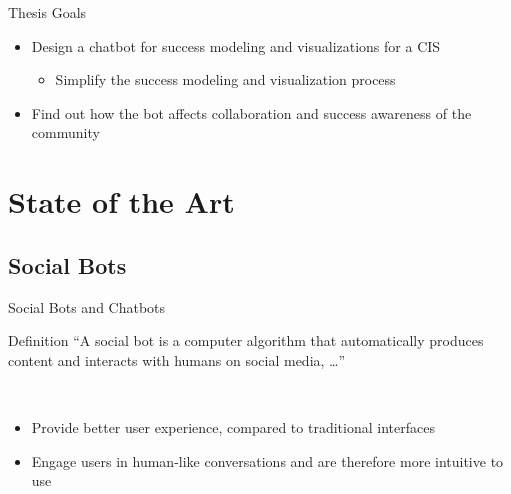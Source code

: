 \begin{frame}{Thesis Goals}
  \begin{itemize}
    \item Design a chatbot for success modeling and visualizations for a CIS
    \begin{itemize}
        \item Simplify the success modeling and visualization process
    \end{itemize}
    \item Find out how the bot affects collaboration and success awareness of the community %
  \end{itemize}
\end{frame}







\section{State of the Art}

\subsection{Social Bots}

\begin{frame}{Social Bots and Chatbots}
  \begin{block}{Definition}
    ``A social bot is a computer algorithm that automatically produces content and interacts with humans on social media, \dots'' \cite{FVD*16b}
  \end{block}
  \ \\
  \begin{itemize}
    \item Provide better user experience, compared to traditional interfaces
    \item Engage users in human-like conversations and are therefore more intuitive to use 
\end{itemize}
\end{frame}


